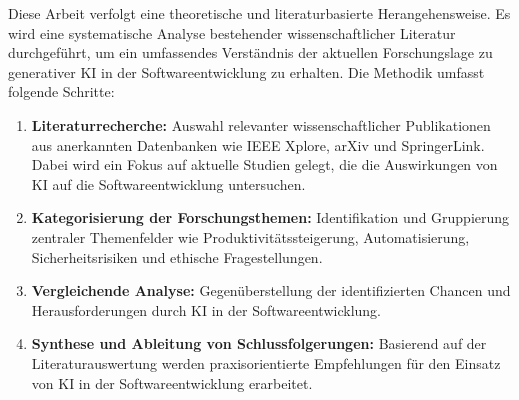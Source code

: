 Diese Arbeit verfolgt eine theoretische und literaturbasierte Herangehensweise. Es wird eine systematische Analyse bestehender wissenschaftlicher Literatur durchgeführt, um ein umfassendes Verständnis der aktuellen Forschungslage zu generativer KI in der Softwareentwicklung zu erhalten. Die Methodik umfasst folgende Schritte:
\begin{enumerate}
    \item \textbf{Literaturrecherche:} Auswahl relevanter wissenschaftlicher Publikationen aus anerkannten Datenbanken wie IEEE Xplore, arXiv und SpringerLink. Dabei wird ein Fokus auf aktuelle Studien gelegt, die die Auswirkungen von KI auf die Softwareentwicklung untersuchen.
    \item \textbf{Kategorisierung der Forschungsthemen:} Identifikation und Gruppierung zentraler Themenfelder wie Produktivitätssteigerung, Automatisierung, Sicherheitsrisiken und ethische Fragestellungen.
    \item \textbf{Vergleichende Analyse:} Gegenüberstellung der identifizierten Chancen und Herausforderungen durch KI in der Softwareentwicklung.
    \item \textbf{Synthese und Ableitung von Schlussfolgerungen:} Basierend auf der Literaturauswertung werden praxisorientierte Empfehlungen für den Einsatz von KI in der Softwareentwicklung erarbeitet.
\end{enumerate}